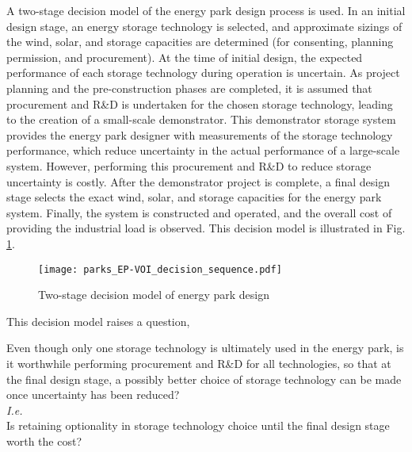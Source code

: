 A two-stage decision model of the energy park design process is used. In an initial design stage, an energy storage technology is selected, and approximate sizings of the wind, solar, and storage capacities are determined (for consenting, planning permission, and procurement).
At the time of initial design, the expected performance of each storage technology during operation is uncertain. As project planning and the pre-construction phases are completed, it is assumed that procurement and R\&D is undertaken for the chosen storage technology, leading to the creation of a small-scale demonstrator. This demonstrator storage system provides the energy park designer with measurements of the storage technology performance, which reduce uncertainty in the actual performance of a large-scale system. However, performing this procurement and R\&D to reduce storage uncertainty is costly.
After the demonstrator project is complete, a final design stage selects the exact wind, solar, and storage capacities for the energy park system. Finally, the system is constructed and operated, and the overall cost of providing the industrial load is observed.
This decision model is illustrated in Fig. \ref{fig:parks-decision-sequence}.\\

\begin{figure}[h]
    \centering
    \hspace*{-1.25cm}\texttt{[image: parks\_EP-VOI\_decision\_sequence.pdf]}
    \caption{Two-stage decision model of energy park design}
    \label{fig:parks-decision-sequence}
\end{figure}
\vspace{0cm}


\newpage
\noindent
This decision model raises a question,\

\begin{cbox}[colback=Aquamarine!10!white]{}
Even though only one storage technology is ultimately used in the energy park, is it worthwhile performing procurement and R\&D for all  technologies, so that at the final design stage, a possibly better choice of storage technology can be made once uncertainty has been reduced?\\
\hspace*{0.5cm}\textit{I.e.}\\
Is retaining optionality in storage technology choice until the final design stage worth the cost?
\end{cbox}


